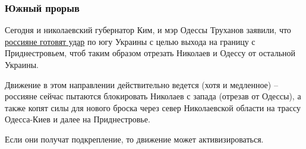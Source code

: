  
 
 
 
 

\subsubsection{Южный прорыв}

Сегодня и николаевский губернатор Ким, и мэр Одессы Труханов заявили, что
\href{https://strana.news/news/381290-odessa-trukhanov-i-kim-hovorjat-chto-rossijane-planirujut-nastuplenie-na-odessu.html}{россияне готовят удар} по югу Украины с целью выхода на границу с
Приднестровьем, чтоб таким образом отрезать Николаев и Одессу от остальной
Украины.

Движение в этом направлении действительно ведется (хотя и медленное) – россияне
сейчас пытаются блокировать Николаев с запада (отрезав от Одессы), а также
копят силы для нового броска через север Николаевской области на трассу
Одесса-Киев и далее на Приднестровье.

Если они получат подкрепление, то движение может активизироваться.
